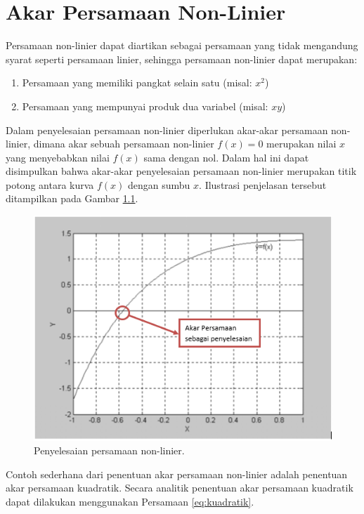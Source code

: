 \documentclass[
]{book}
\providecommand{\tightlist}{%
  \setlength{\itemsep}{0pt}\setlength{\parskip}{0pt}}
\theoremstyle{definition}
\theoremstyle{definition}
\theoremstyle{definition}
\theoremstyle{definition}
\theoremstyle{remark}
\begin{document}
\hypertarget{rootfinding}{%
\chapter{Akar Persamaan Non-Linier}\label{rootfinding}}

Persamaan non-linier dapat diartikan sebagai persamaan yang tidak mengandung syarat seperti persamaan linier, sehingga persamaan non-linier dapat merupakan:

\begin{enumerate}
\def\labelenumi{\alph{enumi}.}
\tightlist
\item
  Persamaan yang memiliki pangkat selain satu (misal: \(x^2\))
\item
  Persamaan yang mempunyai produk dua variabel (misal: \(xy\))
\end{enumerate}

Dalam penyelesaian persamaan non-linier diperlukan akar-akar persamaan non-linier, dimana akar sebuah persamaan non-linier \(f\left(x\right)=0\) merupakan nilai \(x\) yang menyebabkan nilai \(f\left(x\right)\) sama dengan nol. Dalam hal ini dapat disimpulkan bahwa akar-akar penyelesaian persamaan non-linier merupakan titik potong antara kurva \(f\left(x\right)\) dengan sumbu \(x\). Ilustrasi penjelasan tersebut ditampilkan pada Gambar \ref{fig:root}.

\begin{figure}

{\centering \includegraphics[width=0.8\linewidth]{./images/root} 

}

\caption{Penyelesaian persamaan non-linier.}\label{fig:root}
\end{figure}

Contoh sederhana dari penentuan akar persamaan non-linier adalah penentuan akar persamaan kuadratik. Secara analitik penentuan akar persamaan kuadratik dapat dilakukan menggunakan Persamaan \eqref{eq:kuadratik}.
\end{document}
